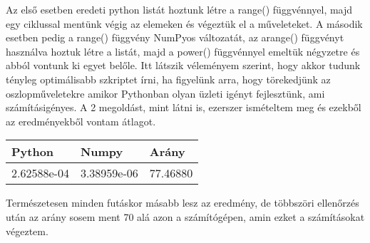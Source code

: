 \documentclass{article}
\theoremstyle{definition}
\theoremstyle{theorem}
\begin{document}
\pagebreak

Az első esetben eredeti python listát hoztunk létre a range() függvénnyel, majd egy ciklussal mentünk végig az elemeken és végeztük el a műveleteket. A második esetben pedig a range() függvény NumPyos változatát, az arange() függvényt használva hoztuk létre a listát, majd a power() függvénnyel emeltük négyzetre és abból vontunk ki egyet belőle. Itt látszik véleményem szerint, hogy akkor tudunk tényleg optimálisabb szkriptet írni, ha figyelünk arra, hogy törekedjünk az oszlopműveletekre amikor Pythonban olyan üzleti igényt fejlesztünk, ami számításigényes.\newline
A 2 megoldást, mint látni is, ezerszer ismételtem meg és ezekből az eredményekből vontam átlagot.\newline


\begin{table}[H]
\centering
\begin{tabular}{|l|l|l|}
\hline
Python      & Numpy       & Arány    \\ \hline
2.62588e-04 & 3.38959e-06 & 77.46880 \\ \hline
\end{tabular}
\end{table}
Természetesen minden futáskor másabb lesz az eredmény, de többszöri ellenőrzés után az arány sosem ment 70 alá azon a számítógépen, amin ezket a számításokat végeztem.
\end{document}
